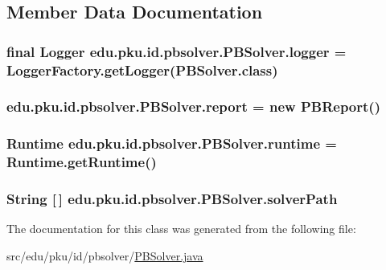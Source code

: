 \subsection{Member Data Documentation}
\hypertarget{classedu_1_1pku_1_1id_1_1pbsolver_1_1_p_b_solver_a119fb3da96f3fdd95c65d5937c24f062}{
\subsubsection[{logger}]{\setlength{\rightskip}{0pt plus 5cm}final Logger {\bf edu.pku.id.pbsolver.PBSolver.logger} = LoggerFactory.getLogger(PBSolver.class)}}
\label{classedu_1_1pku_1_1id_1_1pbsolver_1_1_p_b_solver_a119fb3da96f3fdd95c65d5937c24f062}
\hypertarget{classedu_1_1pku_1_1id_1_1pbsolver_1_1_p_b_solver_afc826fd90f34a98b4008e0a5aabad686}{
\subsubsection[{report}]{ {\bf edu.pku.id.pbsolver.PBSolver.report} = new {\bf PBReport}()}}
\label{classedu_1_1pku_1_1id_1_1pbsolver_1_1_p_b_solver_afc826fd90f34a98b4008e0a5aabad686}
\hypertarget{classedu_1_1pku_1_1id_1_1pbsolver_1_1_p_b_solver_a381f721c0ab0c2455f1b9a508ebb1534}{
\subsubsection[{runtime}]{\setlength{\rightskip}{0pt plus 5cm}Runtime {\bf edu.pku.id.pbsolver.PBSolver.runtime} = Runtime.getRuntime()}}
\label{classedu_1_1pku_1_1id_1_1pbsolver_1_1_p_b_solver_a381f721c0ab0c2455f1b9a508ebb1534}
\hypertarget{classedu_1_1pku_1_1id_1_1pbsolver_1_1_p_b_solver_a2bf17e40556100fe37c06b64e626ad7b}{
\subsubsection[{solverPath}]{\setlength{\rightskip}{0pt plus 5cm}String \mbox{[}$\,$\mbox{]} {\bf edu.pku.id.pbsolver.PBSolver.solverPath}}}
\label{classedu_1_1pku_1_1id_1_1pbsolver_1_1_p_b_solver_a2bf17e40556100fe37c06b64e626ad7b}


The documentation for this class was generated from the following file:\begin{DoxyCompactItemize}
\item 
src/edu/pku/id/pbsolver/\hyperlink{_p_b_solver_8java}{PBSolver.java}\end{DoxyCompactItemize}

